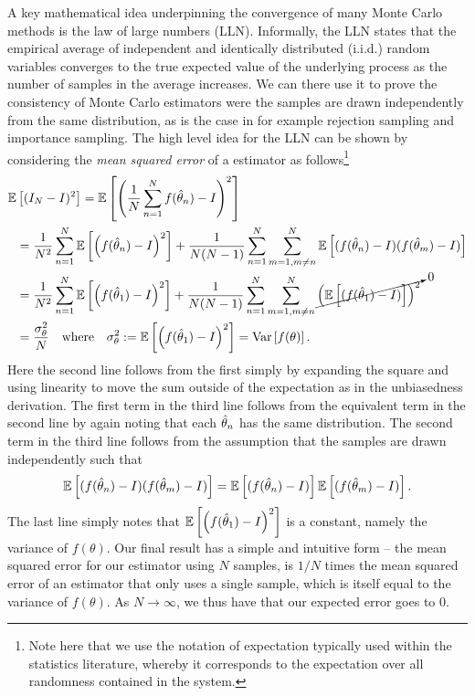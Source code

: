 A key mathematical idea underpinning the convergence of many Monte Carlo methods is the 
law of large numbers (LLN).  Informally, the LLN states that the empirical average of 
independent and identically distributed (i.i.d.)  random variables converges to 
the true expected value of the underlying process as the number of samples in the
average increases.  We can there use it to prove the consistency of Monte Carlo estimators
were the samples are drawn independently from the same distribution, as is the case
in for example rejection sampling and importance sampling.  The high level idea for the LLN can be shown by
considering the  \emph{mean squared error} of a \mc estimator as 
follows\footnote{Note here that we use the notation of expectation typically used within the statistics literature,
whereby it corresponds to the expectation over all randomness contained in the system.}
\begin{align}
\mathbb{E} &\left[(I_N-I)^2\right] = \mathbb{E}\left[\left(\frac{1}{N}\sum_{n=1}^{N}f(\hat{\theta}_n) - I\right)^2\right] \nonumber \\
&= \frac{1}{N^2}\sum_{n=1}^{N} \mathbb{E}\left[ \left(f(\hat{\theta}_n)-I\right)^2\right] + 
\frac{1}{N(N-1)}\sum_{n=1}^{N}\sum_{m=1,m\neq n}^{N} \mathbb{E}\left[ (f(\hat{\theta}_n)-I)(f(\hat{\theta}_m)-I)\right] \nonumber \\
&= \frac{1}{N^2}\sum_{n=1}^{N} \mathbb{E}\left[ \left(f(\hat{\theta}_1)-I\right)^2\right] + 
\frac{1}{N(N-1)}\sum_{n=1}^{N}\sum_{m=1,m\neq n}^{N} \cancelto{0}{\left(\mathbb{E}\left[(f(\hat{\theta}_1)-I)\right]\right)^2} \nonumber \\
&= \frac{\sigma_{\theta}^2}{N}  \quad \text{where} \quad \sigma_{\theta}^2 := \mathbb{E}\left[ \left(f(\hat{\theta}_1)-I\right)^2\right]
= \mathrm{Var} \left[f(\theta)\right].\label{eq:inf:LLN-informal}
\end{align}
Here the second line follows from the first simply by expanding the square and using linearity
to move the sum outside of the expectation as in the unbiasedness derivation.
The first term in the third line follows from the equivalent term in the second line by again noting that
each $\hat{\theta}_n$ has the same distribution.  The second term in the third line
follows from the assumption that the samples are drawn independently such that
\[
\mathbb{E}\left[ (f(\hat{\theta}_n)-I)(f(\hat{\theta}_m)-I)\right] = \mathbb{E}\left[ (f(\hat{\theta}_n)-I)\right] \mathbb{E}\left[(f(\hat{\theta}_m)-I)\right].
\]
The last line simply notes that $\mathbb{E}\left[ \left(f(\hat{\theta}_1)-I\right)^2\right]$ is a constant,
namely the variance of $f(\theta)$.
  Our final result has a simple and intuitive form -- the mean squared error for
our estimator using $N$ samples, is $1/N$ times the mean squared error of an estimator that only uses
a single sample, which is itself equal to the variance of $f(\theta)$.  As $N\rightarrow\infty$, we thus
have that our expected error goes to $0$.

